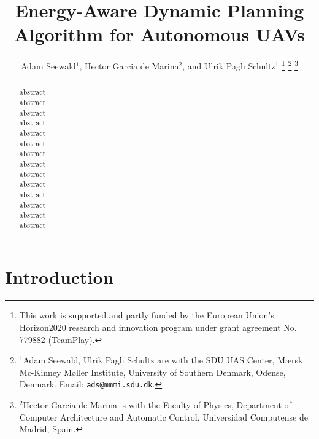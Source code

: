 \documentclass[letterpaper,10pt,conference]{ieeeconf}
\title{\LARGE \bf
Energy-Aware Dynamic Planning Algorithm for Autonomous UAVs
}
\author{
  Adam Seewald$^{1}$, Hector Garcia de Marina$^{2}$, and Ulrik Pagh Schultz$^{1}$
  \thanks{This work is supported and partly funded by the European Union's Horizon2020 research and innovation program under grant agreement No. 779882 (TeamPlay).
  }
  \thanks{$^{1}$Adam Seewald, Ulrik Pagh Schultz are with the SDU UAS Center, M{\ae}rsk Mc-Kinney M{\o}ller Institute, University of Southern Denmark, Odense, Denmark. Email: {\tt\small ads@mmmi.sdu.dk}.}
  \thanks{$^{2}$Hector Garcia de Marina is with the Faculty of Physics, Department of Computer Architecture and Automatic Control, Universidad Computense de Madrid, Spain.}
}
\theoremstyle{definition}
\begin{document}
\maketitle

\thispagestyle{empty}
\pagestyle{empty}

\begin{abstract}

  abstract\\
  abstract\\
  abstract\\
  abstract\\
  abstract\\
  abstract\\
  abstract\\
  abstract\\
  abstract\\
  abstract\\
  abstract\\
  abstract\\
  abstract\\
  abstract
\end{abstract}

%
\IEEEpeerreviewmaketitle


\section{Introduction}
\label{sec:intro}
\end{document}
